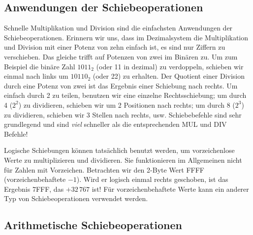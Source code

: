 \subsection{Anwendungen der Schiebeoperationen}

Schnelle Multiplikation und Division sind die einfachsten
Anwendungen der Schiebeoperationen. Erinnern wir uns, dass im
Dezimalsystem die Multiplikation und Division mit einer Potenz von
zehn einfach ist, es sind nur Ziffern zu verschieben. Das gleiche
trifft auf Potenzen von zwei im Bin\"{a}ren zu. Um zum Beispiel die
bin\"{a}re Zahl $1011_2$ (oder 11 in dezimal) zu verdoppeln, schieben
wir einmal nach links um $10110_2$ (oder 22) zu erhalten. Der
Quotient einer Division durch eine Potenz von zwei ist das Ergebnis
einer Schiebung nach rechts. Um einfach durch 2 zu teilen, benutzen
wir eine einzelne Rechtsschiebung; um durch 4 ($2^2$) zu dividieren,
schieben wir um 2 Positionen nach rechts; um durch 8 ($2^3$) zu
dividieren, schieben wir 3 Stellen nach rechts, usw\@.
Schiebebefehle sind sehr grundlegend und sind \emph{viel} schneller
als die entsprechenden {\code MUL}  und
{\code DIV}  Befehle!

Logische Schiebungen k\"{o}nnen tats\"{a}chlich benutzt werden, um
vorzeichenlose Werte zu multiplizieren und dividieren. Sie
funktionieren im Allgemeinen nicht f\"{u}r Zahlen mit Vorzeichen.
Betrachten wir den 2-Byte Wert FFFF (vorzeichenbehaftete $-1$). Wird
er logisch einmal rechts geschoben, ist das Ergebnis 7FFF, das
$+32\,767$ ist! F\"{u}r vorzeichenbehaftete Werte kann ein anderer Typ
von Schiebeoperationen verwendet werden.

\subsection{Arithmetische Schiebeoperationen}

